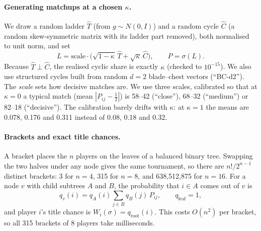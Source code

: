 \documentclass[11pt]{article}
\theoremstyle{remark}
\newcommand{\kap}{\kappa}
\begin{document}
\paragraph{Generating matchups at a chosen $\kap$.} We draw a random ladder $\hat T$ (from $g\sim N(0,I)$) and a random cycle
$\hat C$ (a random skew-symmetric matrix with its ladder part removed), both normalised to unit norm, and set
\begin{equation}
L = \text{scale}\cdot\big(\sqrt{1-\kap}\,\hat T + \sqrt{\kap}\,\hat C\big),\qquad P=\sigma(L).
\end{equation}
Because $\hat T\perp\hat C$, the realised cyclic share is exactly $\kap$ (checked to $10^{-15}$). We also use structured
cycles built from random $d=2$ blade--chest vectors (``BC-d2''). The \emph{scale} sets how decisive matches are. We use
three scales, calibrated so that at $\kap=0$ a typical match (mean $|P_{ij}-\tfrac12|$) is 58--42 (``close''), 68--32
(``medium'') or 82--18 (``decisive''). The calibration barely drifts with $\kap$: at $\kap=1$ the means are 0.078, 0.176
and 0.311 instead of 0.08, 0.18 and 0.32.

\paragraph{Brackets and exact title chances.} A bracket places the $n$ players on the leaves of a balanced binary tree.
Swapping the two halves under any node gives the same tournament, so there are $n!/2^{n-1}$ distinct brackets: 3 for
$n=4$, 315 for $n=8$, and 638{,}512{,}875 for $n=16$. For a node $v$ with child subtrees $A$ and $B$, the probability that
$i\in A$ comes out of $v$ is
\begin{equation}
q_v(i) = q_A(i)\sum_{j\in B} q_B(j)\,P_{ij},\qquad q_{\text{leaf}}=1,
\end{equation}
and player $i$'s title chance is $W_i(\sigma)=q_{\text{root}}(i)$. This costs $O(n^2)$ per bracket, so all 315 brackets of 8
players take milliseconds.
\end{document}
